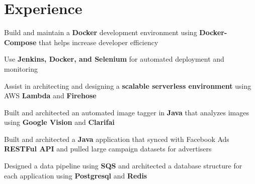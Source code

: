 \documentclass[]{resume}
\begin{document}
\begin{minipage}[t]{0.66\textwidth}


\section{Experience}

\begin{tightemize}
\vspace{\topsep}
\item Build and maintain a \textbf{Docker} development environment using \textbf{Docker-Compose} that helps increase developer efficiency
\item Use \textbf{Jenkins, Docker, and Selenium} for automated deployment and monitoring
\item Assist in architecting and designing a \textbf{scalable serverless environment} using AWS \textbf{Lambda} and \textbf{Firehose}
\item Built and architected an automated image tagger in \textbf{Java} that analyzes images using \textbf{Google Vision} and \textbf{Clarifai}
\item Built and architected a \textbf{Java} application that synced with Facebook Ads \textbf{RESTFul API} and pulled large campaign datasets for advertisers
\item Designed a data pipeline using \textbf{SQS} and architected a database structure for each application using \textbf{Postgresql} and \textbf{Redis}
\end{tightemize}
\sectionsep




\end{minipage}
\end{document}
